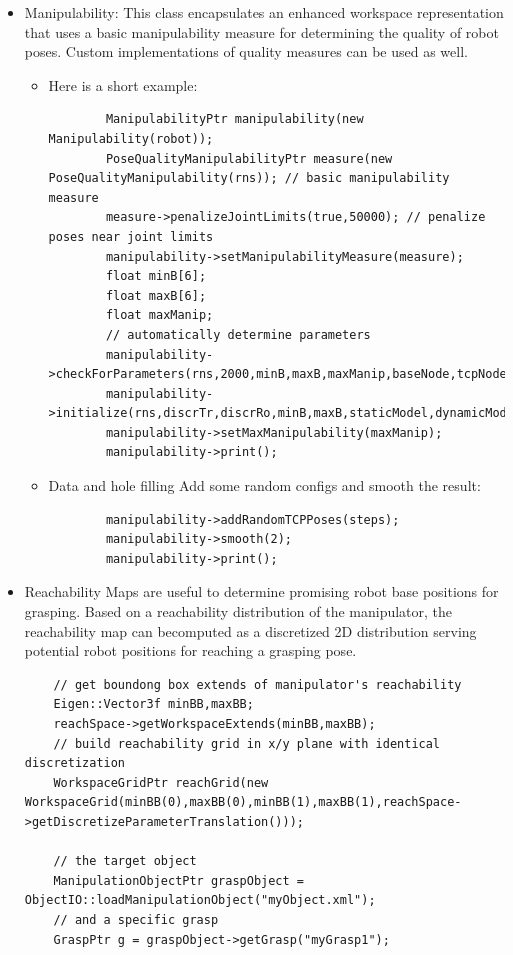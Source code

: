 \documentclass{book}
\begin{document}
\begin{itemize}
\item Manipulability: This class encapsulates an enhanced workspace representation that uses a basic manipulability measure for determining the quality of robot poses. Custom implementations of quality measures can be used as well.  
\begin{itemize}
\item Here is a short example: 
     \begin{lstlisting}
        ManipulabilityPtr manipulability(new Manipulability(robot));
        PoseQualityManipulabilityPtr measure(new PoseQualityManipulability(rns)); // basic manipulability measure
        measure->penalizeJointLimits(true,50000); // penalize poses near joint limits
        manipulability->setManipulabilityMeasure(measure);
        float minB[6];
        float maxB[6];
        float maxManip;
        // automatically determine parameters
        manipulability->checkForParameters(rns,2000,minB,maxB,maxManip,baseNode,tcpNode);
        manipulability->initialize(rns,discrTr,discrRo,minB,maxB,staticModel,dynamicModel,baseNode,tcpNode);
        manipulability->setMaxManipulability(maxManip);
        manipulability->print();  
        \end{lstlisting}
\item Data and hole filling 
Add some random configs and smooth the result: 
     \begin{lstlisting}
        manipulability->addRandomTCPPoses(steps);
        manipulability->smooth(2);
        manipulability->print();  
        \end{lstlisting}
\end{itemize}
\item Reachability Maps are useful to determine promising robot base positions for grasping. Based on a reachability distribution of the manipulator, the reachability map can becomputed as a discretized 2D distribution serving potential robot positions for reaching a grasping pose. 
\begin{lstlisting}
    // get boundong box extends of manipulator's reachability 
    Eigen::Vector3f minBB,maxBB;
    reachSpace->getWorkspaceExtends(minBB,maxBB);
    // build reachability grid in x/y plane with identical discretization
    WorkspaceGridPtr reachGrid(new WorkspaceGrid(minBB(0),maxBB(0),minBB(1),maxBB(1),reachSpace->getDiscretizeParameterTranslation()));

    // the target object 
    ManipulationObjectPtr graspObject = ObjectIO::loadManipulationObject("myObject.xml");
    // and a specific grasp
    GraspPtr g = graspObject->getGrasp("myGrasp1");


\end{lstlisting}
\end{itemize}
\end{document}
